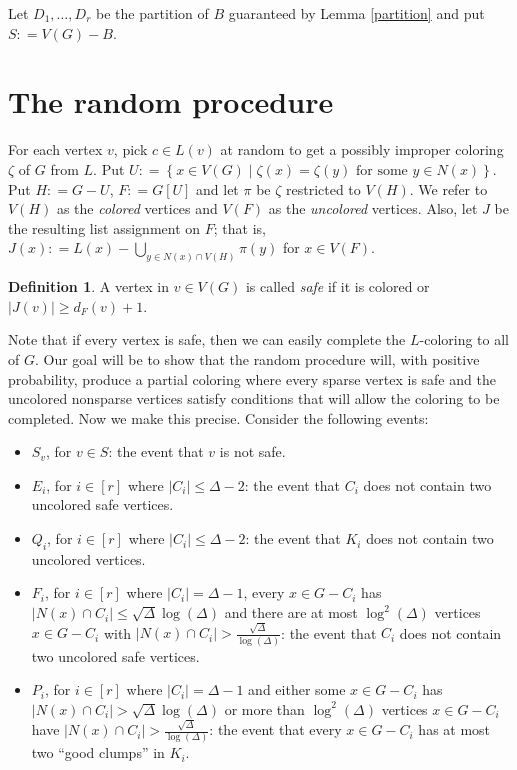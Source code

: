 \documentclass[12pt]{article}
\theoremstyle{plain}
\theoremstyle{definition}
\newtheorem{defn}{Definition}
\theoremstyle{remark}
\newcommand{\setb}[3]{\left\{ #1 \in #2 \mid #3 \right\}}
\newcommand{\card}[1]{\left|#1\right|}
\newcommand{\irange}[1]{\left[#1\right]}
\newcommand{\DefinedAs}{\mathrel{\mathop:}=}
\begin{document}
\noindent Let $D_1, \ldots, D_r$ be the partition of $B$ guaranteed by Lemma
\ref{partition} and put $S \DefinedAs V(G) - B$.

\section{The random procedure}
For each vertex $v$, pick $c \in L(v)$ at random to get a possibly improper
coloring $\zeta$ of $G$ from $L$.  Put $U \DefinedAs \setb{x}{V(G)}{\zeta(x) =
\zeta(y) \text{ for some $y \in N(x)$}}$.  Put $H \DefinedAs G - U$, $F
\DefinedAs G[U]$ and let $\pi$ be $\zeta$ restricted to $V(H)$.  We refer
to $V(H)$ as the \emph{colored} vertices and $V(F)$ as the \emph{uncolored}
vertices.  Also, let $J$ be the resulting list assignment on $F$; that is, $J(x)
\DefinedAs L(x) - \bigcup_{y \in N(x) \cap V(H)} \pi(y)$ for $x \in V(F)$.

\begin{defn}
A vertex in $v \in V(G)$ is called \emph{safe} if it is colored or $\card{J(v)}
\geq d_F(v) + 1$.
\end{defn}

Note that if every vertex is safe, then we can easily complete the $L$-coloring
to all of $G$.  Our goal will be to show that the random procedure will, with
positive probability, produce a partial coloring where every sparse vertex is
safe and the uncolored nonsparse vertices satisfy conditions that will allow the
coloring to be completed.  Now we make this precise.  Consider the following
events:

\begin{itemize}
  \item $S_v$, for $v \in S$: the event that $v$ is not safe.
  \item $E_i$, for $i \in \irange{r}$ where $\card{C_i} \leq \Delta - 2$: the event that $C_i$ does not contain two uncolored safe vertices.
  \item $Q_i$, for $i \in \irange{r}$ where $\card{C_i} \leq \Delta - 2$: the event that $K_i$ does not contain two uncolored vertices.
  \item $F_i$, for $i \in \irange{r}$ where $\card{C_i} = \Delta - 1$, every $x
  \in G - C_i$ has $\card{N(x) \cap C_i} \leq \sqrt{\Delta}\log(\Delta)$ and
  there are at most $\log^2(\Delta)$ vertices $x \in G - C_i$ with $\card{N(x)
  \cap C_i} > \frac{\sqrt{\Delta}}{\log(\Delta)}$: the event that
  $C_i$ does not contain two uncolored safe vertices.
  \item $P_i$, for $i \in \irange{r}$ where $\card{C_i} = \Delta - 1$ and either some $x \in G
  - C_i$ has $\card{N(x) \cap C_i} > \sqrt{\Delta}\log(\Delta)$ or more than
  $\log^2(\Delta)$ vertices $x \in G - C_i$ have $\card{N(x) \cap C_i} >
  \frac{\sqrt{\Delta}}{\log(\Delta)}$: the event that every $x \in G - C_i$ has
  at most two ``good clumps'' in $K_i$.
\end{itemize}
\end{document}
